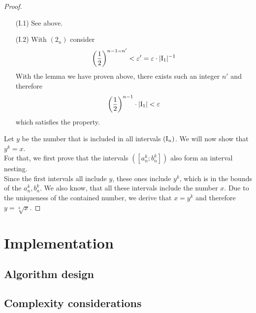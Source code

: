 \documentclass[a4paper, 10pt]{article}
\theoremstyle{remark}
\theoremstyle{definition}
\begin{document}
\begin{proof}
    \begin{itemize}[label={}]
        \item[(I.1)]
        See above. %

        \item[(I.2)]
        With \((2_n)\) consider
        \[
            \left(\frac{1}{2}\right)^{n-1=n'} < \varepsilon' = \varepsilon \cdot |\text{I}_1|^{-1}
        \]
        With the lemma we have proven above, there exists such an integer \(n'\) and therefore
        \[
            \left(\frac{1}{2}\right)^{n-1} \cdot |\text{I}_1| < \varepsilon 
        \]
        which satisfies the property.
    \end{itemize}

    Let \(y\) be the number that is included  in all intervals \((\text{I}_n)\). We will now show that \(y^k = x\).\\

    For that, we first prove that the intervals \(([a_n^k; b_n^k])\) also form an interval nesting.\\
    
    
    Since the first intervals all include \(y\), these ones include \(y^k\), which is in the bounds of the \(a_n^k, b_n^k\). We also know, that all these intervals include the number \(x\). Due to the uniqueness of the contained number, we derive that \(x = y^k\) and therefore \(y = \sqrt[k]{x}\).

    \end{proof}

    \section{Implementation}

    \subsection{Algorithm design}

    \subsection{Complexity considerations}

    \printbibliography
\end{document}
